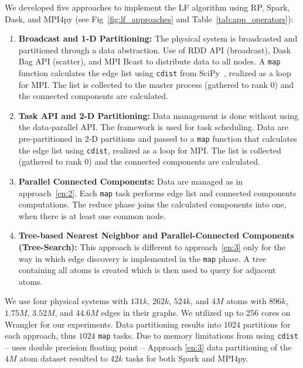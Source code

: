 We developed five approaches to implement the LF algorithm using RP,
Spark, Dask, and MPI4py (see Fig~\ref{fig:lf_approaches} and
Table~\ref{tab:app_operators}):
\begin{enumerate}[1)]
    \item \textbf{Broadcast and 1-D Partitioning:} The physical system is
    broadcasted and partitioned through a data abstraction. Use of RDD API
    (broadcast), Dask Bag API (scatter), and MPI Bcast to distribute data to all
    nodes. A \texttt{map} function calculates the edge list using \texttt{cdist}
    from SciPy~\cite{scipy}, realized as a loop for MPI. The list is collected
    to the master process (gathered to rank 0) and the connected components are
    calculated.\label{en:1}
    \item \textbf{Task API and 2-D Partitioning:} Data management is done
    without using the data-parallel API. The framework is used for task
    scheduling. Data are pre-partitioned in 2-D partitions and passed to a
    \texttt{map} function that calculates the edge list using \texttt{cdist},
    realized as a loop for MPI. The list is collected (gathered to rank 0) and
    the connected components are calculated.\label{en:2}
    \item \textbf{Parallel Connected Components:} Data are managed as in
    approach~\ref{en:2}. Each \texttt{map} task performs edge list and connected
    components computations. The reduce phase joins the calculated components
    into one, when there is at least one common node.\label{en:3}
    \item \textbf{Tree-based Nearest Neighbor and Parallel-Connected Components
    (Tree-Search):} This approach is different to approach~\ref{en:3} only for
    the way in which edge discovery is implemented in the \texttt{map} phase. A
    tree containing all atoms is created which is then used to query for
    adjacent atoms.\label{en:4}
\end{enumerate}

We use four physical systems with $131k$, $262k$, $524k$, and $4M$ atoms with
$896k$, $1.75M$, $3.52M$, and $44.6M$ edges in their graphs. We utilized up to
256 cores on Wrangler for our experiments. Data partitioning results into $1024$
partitions for each approach, thus $1024$ \texttt{map} tasks. Due to memory
limitations from using \texttt{cdist} -- uses double precision floating point --
Approach \ref{en:3} data partitioning of the $4M$ atom dataset resulted to $42k$
tasks for both Spark and MPI4py.

